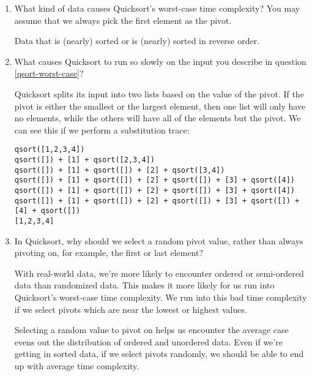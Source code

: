 \documentclass[11pt]{article}
\newenvironment{answer}{\large\lstset{basicstyle=\tiny\ttfamily}\color{white}}{}
\newenvironment{answer}{\large\lstset{basicstyle=\large\ttfamily}\color{red}}{}
\begin{document}
\begin{enumerate}
\item\label{qsort-worst-case} What kind of data causes Quicksort's worst-case
      time complexity? You may assume that we always pick the first element as
      the pivot.

      \begin{answer}
      Data that is (nearly) sorted or is (nearly) sorted in reverse order.
      \end{answer}

\item What causes Quicksort to run so slowly on the input you describe in
      question \ref{qsort-worst-case}?

    \begin{answer}
    Quicksort splits its input into two lists based on the value of the pivot.
    If the pivot is either the smallest or the largest element, then one list
    will only have no elements, while the others will have all of the elements
    but the pivot. We can see this if we perform a substitution trace:

\begin{verbatim}
qsort([1,2,3,4])
qsort([]) + [1] + qsort([2,3,4])
qsort([]) + [1] + qsort([]) + [2] + qsort([3,4])
qsort([]) + [1] + qsort([]) + [2] + qsort([]) + [3] + qsort([4])
qsort([]) + [1] + qsort([]) + [2] + qsort([]) + [3] + qsort([4])
qsort([]) + [1] + qsort([]) + [2] + qsort([]) + [3] + qsort([]) + [4] + qsort([])
[1,2,3,4]
\end{verbatim}
    \end{answer}

\item In Quicksort, why should we select a random pivot value, rather than always
      pivoting on, for example, the first or last element?

      \begin{answer}
      With real-world data, we're more likely to encounter ordered or
      semi-ordered data than randomized data. This makes it more likely for us
      run into Quicksort's worst-case time complexity. We run into this bad
      time complexity if we select pivots which are near the lowest or highest
      values.

      Selecting a random value to pivot on helps us encounter the average case
      evens out the distribution of ordered and unordered data. Even if we're
      getting in sorted data, if we select pivots randomly, we should be able
      to end up with average time complexity.
      \end{answer}


\end{enumerate}
\end{document}
